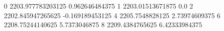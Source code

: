 0 2203.977783203125 0.962646484375
1 2203.01513671875 0.0
2 2202.845947265625 -0.169189453125
4 2205.7548828125 2.73974609375
6 2208.75244140625 5.7373046875
8 2209.4384765625 6.42333984375
